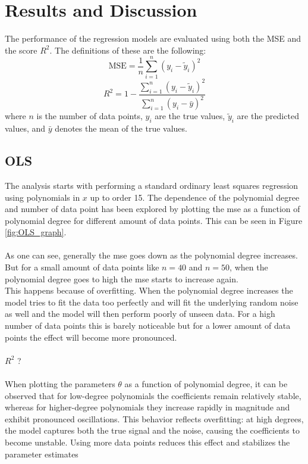 \documentclass[
 reprint,            %
 amsmath,amssymb,
 aps,
]{revtex4-2}
\begin{document}
\section{Results and Discussion}
The performance of the regression models are evaluated using both the MSE and the score $R^2$. The definitions of these are the following:
$$ \mathrm{MSE} = \frac{1}{n} \sum_{i=1}^{n} \left( y_i - \tilde{y}_i \right)^2$$
$$R^2 = 1 - \frac{\sum_{i=1}^{n} \left( y_i - \tilde{y}_i \right)^2}{\sum_{i=1}^{n} \left( y_i - \bar{y} \right)^2}$$
where $n$ is the number of data points, $y_i$ are the true values, $\tilde{y}_i$ are the predicted values, and $\bar{y}$ denotes the mean of the true values.

\subsection{OLS}

The analysis starts with performing a standard ordinary least squares regression using polynomials in $x$ up to order 15. The dependence of the polynomial degree and number of data point has been explored by plotting the mse as a function of polynomial degree for different amount of data points. This can be seen in Figure \ref{fig:OLS_graph}.\\\\
As one can see, generally the mse goes down as the polynomial degree increases. But for a small amount of data points like $n = 40$ and $n = 50$, when the polynomial degree goes to high the mse starts to increase again.\\
This happens because of overfitting. When the polynomial degree increases the model tries to fit the data too perfectly and will fit the underlying random noise as well and the model will then perform poorly of unseen data. For a high number of data points this is barely noticeable but for a lower amount of data points the effect will become more pronounced.\\\\
$R^2$ ?\\\\
When plotting the parameters $\theta$ as a function of polynomial degree, it can be observed that for low-degree polynomials the coefficients remain relatively stable, whereas for higher-degree polynomials they increase rapidly in magnitude and exhibit pronounced oscillations.
This behavior reflects overfitting: at high degrees, the model captures both the true signal and the noise, causing the coefficients to become unstable. Using more data points reduces this effect and stabilizes the parameter estimates
    
\end{document}
